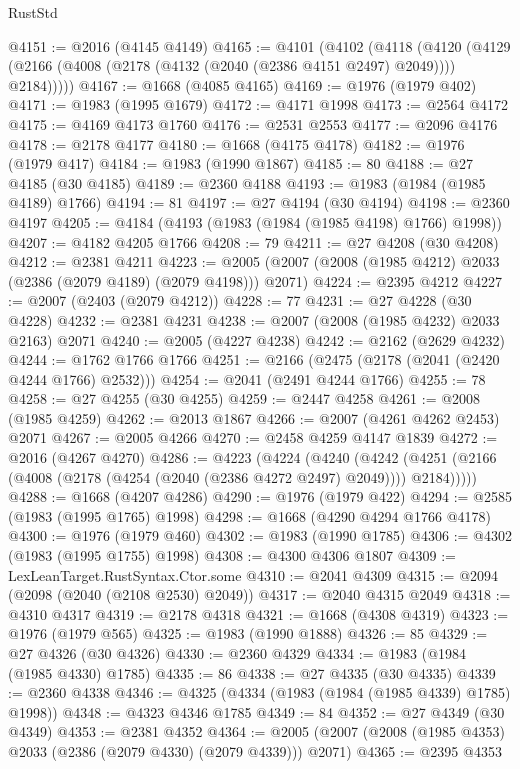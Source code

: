 \begin{lexlean}{RustStd}
\begin{coremodule}
@4151 := @2016 (@4145 @4149)
@4165 := @4101
    (@4102
      (@4118
        (@4120 (@4129 (@2166 (@4008 (@2178 (@4132 (@2040 (@2386 @4151 @2497) @2049)))) @2184)))))
@4167 := @1668 (@4085 @4165)
@4169 := @1976 (@1979 @402)
@4171 := @1983 (@1995 @1679)
@4172 := @4171 @1998
@4173 := @2564 @4172
@4175 := @4169 @4173 @1760
@4176 := @2531 @2553
@4177 := @2096 @4176
@4178 := @2178 @4177
@4180 := @1668 (@4175 @4178)
@4182 := @1976 (@1979 @417)
@4184 := @1983 (@1990 @1867)
@4185 := 80
@4188 := @27 @4185 (@30 @4185)
@4189 := @2360 @4188
@4193 := @1983 (@1984 (@1985 @4189) @1766)
@4194 := 81
@4197 := @27 @4194 (@30 @4194)
@4198 := @2360 @4197
@4205 := @4184 (@4193 (@1983 (@1984 (@1985 @4198) @1766) @1998))
@4207 := @4182 @4205 @1766
@4208 := 79
@4211 := @27 @4208 (@30 @4208)
@4212 := @2381 @4211
@4223 := @2005 (@2007 (@2008 (@1985 @4212) @2033 (@2386 (@2079 @4189) (@2079 @4198))) @2071)
@4224 := @2395 @4212
@4227 := @2007 (@2403 (@2079 @4212))
@4228 := 77
@4231 := @27 @4228 (@30 @4228)
@4232 := @2381 @4231
@4238 := @2007 (@2008 (@1985 @4232) @2033 @2163) @2071
@4240 := @2005 (@4227 @4238)
@4242 := @2162 (@2629 @4232)
@4244 := @1762 @1766 @1766
@4251 := @2166 (@2475 (@2178 (@2041 (@2420 @4244 @1766) @2532)))
@4254 := @2041 (@2491 @4244 @1766)
@4255 := 78
@4258 := @27 @4255 (@30 @4255)
@4259 := @2447 @4258
@4261 := @2008 (@1985 @4259)
@4262 := @2013 @1867
@4266 := @2007 (@4261 @4262 @2453) @2071
@4267 := @2005 @4266
@4270 := @2458 @4259 @4147 @1839
@4272 := @2016 (@4267 @4270)
@4286 := @4223
    (@4224
      (@4240
        (@4242 (@4251 (@2166 (@4008 (@2178 (@4254 (@2040 (@2386 @4272 @2497) @2049)))) @2184)))))
@4288 := @1668 (@4207 @4286)
@4290 := @1976 (@1979 @422)
@4294 := @2585 (@1983 (@1995 @1765) @1998)
@4298 := @1668 (@4290 @4294 @1766 @4178)
@4300 := @1976 (@1979 @460)
@4302 := @1983 (@1990 @1785)
@4306 := @4302 (@1983 (@1995 @1755) @1998)
@4308 := @4300 @4306 @1807
@4309 := LexLeanTarget.RustSyntax.Ctor.some
@4310 := @2041 @4309
@4315 := @2094 (@2098 (@2040 (@2108 @2530) @2049))
@4317 := @2040 @4315 @2049
@4318 := @4310 @4317
@4319 := @2178 @4318
@4321 := @1668 (@4308 @4319)
@4323 := @1976 (@1979 @565)
@4325 := @1983 (@1990 @1888)
@4326 := 85
@4329 := @27 @4326 (@30 @4326)
@4330 := @2360 @4329
@4334 := @1983 (@1984 (@1985 @4330) @1785)
@4335 := 86
@4338 := @27 @4335 (@30 @4335)
@4339 := @2360 @4338
@4346 := @4325 (@4334 (@1983 (@1984 (@1985 @4339) @1785) @1998))
@4348 := @4323 @4346 @1785
@4349 := 84
@4352 := @27 @4349 (@30 @4349)
@4353 := @2381 @4352
@4364 := @2005 (@2007 (@2008 (@1985 @4353) @2033 (@2386 (@2079 @4330) (@2079 @4339))) @2071)
@4365 := @2395 @4353

\end{coremodule}
\end{lexlean}
